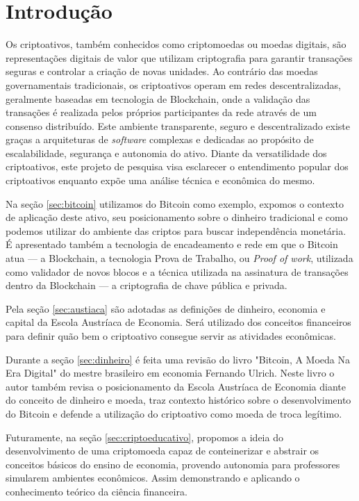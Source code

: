 
\chapter{Introdução}

Os criptoativos, também conhecidos como criptomoedas ou moedas digitais, são representações digitais de valor que utilizam criptografia para garantir transações seguras e controlar a criação de novas unidades. Ao contrário das moedas governamentais tradicionais, os criptoativos operam em redes descentralizadas, geralmente baseadas em tecnologia de Blockchain, onde a validação das transações é realizada pelos próprios participantes da rede através de um consenso distribuído. Este ambiente transparente, seguro e descentralizado existe graças a arquiteturas de \textit{software} complexas e dedicadas ao propósito de escalabilidade, segurança e autonomia do ativo. Diante da versatilidade dos criptoativos, este projeto de pesquisa visa esclarecer o entendimento popular dos criptoativos enquanto expõe uma análise técnica e econômica do mesmo. 

Na seção \ref*{sec:bitcoin} utilizamos do Bitcoin como exemplo, expomos o contexto de aplicação deste ativo, seu posicionamento sobre o dinheiro tradicional e como podemos utilizar do ambiente das criptos para buscar independência monetária. É apresentado também a tecnologia de encadeamento e rede em que o Bitcoin atua — a Blockchain, a tecnologia Prova de Trabalho, ou \textit{Proof of work}, utilizada como validador de novos blocos e a técnica utilizada na assinatura de transações dentro da Blockchain — a criptografia de chave pública e privada.

Pela seção \ref*{sec:austiaca} são adotadas as definições de dinheiro, economia e capital da Escola Austríaca de Economia. Será utilizado dos conceitos financeiros para definir quão bem o criptoativo consegue servir as atividades econômicas.

Durante a seção \ref*{sec:dinheiro} é feita uma revisão do livro "Bitcoin, A Moeda Na Era Digital" do mestre brasileiro em economia Fernando Ulrich. Neste livro o autor também revisa o posicionamento da Escola Austríaca de Economia diante do conceito de dinheiro e moeda, traz contexto histórico sobre o desenvolvimento do Bitcoin e defende a utilização do criptoativo como moeda de troca legítimo.

Futuramente, na seção \ref*{sec:criptoeducativo}, propomos a ideia do desenvolvimento de uma criptomoeda capaz de conteinerizar e abstrair os conceitos básicos do ensino de economia, provendo autonomia para professores simularem ambientes econômicos. Assim demonstrando e aplicando o conhecimento teórico da ciência financeira.

